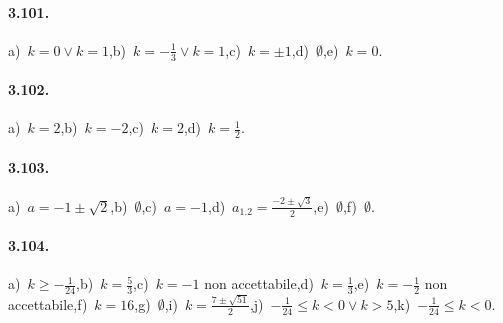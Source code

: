 \paragraph{3.101.} a)~$ k = 0 \vee k = 1 $,\quad b)~$ k =-\frac{1}{3} \vee k = 1 $,\quad c)~$ k = \pm 1 $,\quad d)~$ \emptyset $,\quad e)~$ k=0 $.

\paragraph{3.102.} a)~$ k = 2 $,\quad b)~$ k = -2 $,\quad c)~$ k = 2 $,\quad d)~$ k = \frac{1}{2} $.

\paragraph{3.103.} a)~$ a =-1 \pm \sqrt{2} $,\quad b)~$ \emptyset $,\quad c)~$ a =-1 $,\quad d)~$ a_{1.2} =\frac{- 2 \pm \sqrt{3}}{2} $,\quad e)~$ \emptyset $,\quad f)~$ \emptyset $.

\paragraph{3.104.} a)~$ k \geq-\frac{1}{24} $,\quad b)~$ k = \frac{5}{3} $,\quad c)~$ k=-1 $ non accettabile,\quad d)~$ k = \frac{1}{3} $,\quad e)~$ k =-\frac{1}{2}$ non accettabile,\quad f)~$ k = 16 $,\quad g)~$ \emptyset $,\quad i)~$ k = \frac{7 \pm \sqrt{51}}{2} $,\quad j)~$ - \frac{1}{24} \leq k < 0 \vee k > 5 $,\quad k)~$ - \frac{1}{24} \leq k < 0 $.

